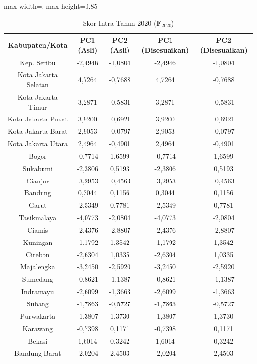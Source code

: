 \begin{table}[H]
\centering
\caption{Skor Intra Tahun 2020 ($\mathbf{F}_{2020}$)} \label{tab:app1skor_intra_2020}
\begin{adjustbox}{max width=\textwidth, max height=0.85\textheight}
\begin{tabular}{|c|c|c|c|c|}
\hline
\textbf{Kabupaten/Kota} & \textbf{PC1 (Asli)} & \textbf{PC2 (Asli)} & \textbf{PC1 (Disesuaikan)} & \textbf{PC2 (Disesuaikan)} \\
\hline
Kep. Seribu & -2,4946 & -1,0804 & -2,4946 & -1,0804 \\
Kota Jakarta Selatan & 4,7264 & -0,7688 & 4,7264 & -0,7688 \\
Kota Jakarta Timur & 3,2871 & -0,5831 & 3,2871 & -0,5831 \\
Kota Jakarta Pusat & 3,9200 & -0,6921 & 3,9200 & -0,6921 \\
Kota Jakarta Barat & 2,9053 & -0,0797 & 2,9053 & -0,0797 \\
Kota Jakarta Utara & 2,4964 & -0,4901 & 2,4964 & -0,4901 \\
Bogor & -0,7714 & 1,6599 & -0,7714 & 1,6599 \\
Sukabumi & -2,3806 & 0,5193 & -2,3806 & 0,5193 \\
Cianjur & -3,2953 & -0,4563 & -3,2953 & -0,4563 \\
Bandung & 0,3044 & 0,1156 & 0,3044 & 0,1156 \\
Garut & -2,5349 & 0,7781 & -2,5349 & 0,7781 \\
Tasikmalaya & -4,0773 & -2,0804 & -4,0773 & -2,0804 \\
Ciamis & -2,4376 & -2,8807 & -2,4376 & -2,8807 \\
Kuningan & -1,1792 & 1,3542 & -1,1792 & 1,3542 \\
Cirebon & -2,6304 & 1,0335 & -2,6304 & 1,0335 \\
Majalengka & -3,2450 & -2,5920 & -3,2450 & -2,5920 \\
Sumedang & -0,8621 & -1,1387 & -0,8621 & -1,1387 \\
Indramayu & -2,6099 & -1,3663 & -2,6099 & -1,3663 \\
Subang & -1,7863 & -0,5727 & -1,7863 & -0,5727 \\
Purwakarta & -1,3807 & 1,3730 & -1,3807 & 1,3730 \\
Karawang & -0,7398 & 0,1171 & -0,7398 & 0,1171 \\
Bekasi & 1,6014 & 0,3242 & 1,6014 & 0,3242 \\
Bandung Barat & -2,0204 & 2,4503 & -2,0204 & 2,4503 \\

\end{tabular}
\end{adjustbox}
\end{table}
